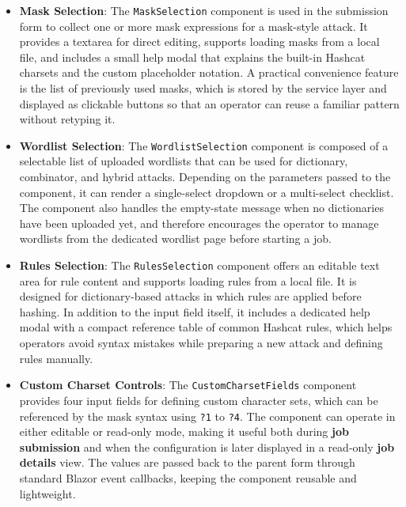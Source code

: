 \begin{itemize}
    

    \item \textbf{Mask Selection}: The \verb|MaskSelection| component is used in the submission form to collect one or more mask expressions for a mask-style attack. It provides a textarea for direct editing, supports loading masks from a local file, and includes a small help modal that explains the built-in Hashcat charsets and the custom placeholder notation. A practical convenience feature is the list of previously used masks, which is stored by the service layer and displayed as clickable buttons so that an operator can reuse a familiar pattern without retyping it.


    \item \textbf{Wordlist Selection}: The \verb|WordlistSelection| component is composed of a selectable list of uploaded wordlists that can be used for dictionary, combinator, and hybrid attacks. Depending on the parameters passed to the component, it can render a single-select dropdown or a multi-select checklist. The component also handles the empty-state message when no dictionaries have been uploaded yet, and therefore encourages the operator to manage wordlists from the dedicated wordlist page before starting a job.


    \item \textbf{Rules Selection}: The \verb|RulesSelection| component offers an editable text area for rule content and supports loading rules from a local file. It is designed for dictionary-based attacks in which rules are applied before hashing. In addition to the input field itself, it includes a dedicated help modal with a compact reference table of common Hashcat rules, which helps operators avoid syntax mistakes while preparing a new attack and defining rules manually.


    \item \textbf{Custom Charset Controls}: The \verb|CustomCharsetFields| component provides four input fields for defining custom character sets, which can be referenced by the mask syntax using \verb|?1| to \verb|?4|. The component can operate in either editable or read-only mode, making it useful both during \textbf{job submission} and when the configuration is later displayed in a read-only \textbf{job details} view. The values are passed back to the parent form through standard Blazor event callbacks, keeping the component reusable and lightweight.


    
    


\end{itemize}
